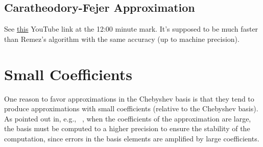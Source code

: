 \documentclass[../fheimpl.tex]{subfiles}
\begin{document}
    \subsection{Caratheodory-Fejer Approximation}
    See \href{https://www.youtube.com/watch?v=6JPwpTOcydM&list=PLnbmMskCVh1cCnWbmgxI0BM0UD2JHH9fz&index=6}{this} YouTube link at the 12:00 minute mark. It's supposed to be much faster than Remez's algorithm with the same accuracy (up to machine precision).

    \section{Small Coefficients}
    \label{sec:small-approx-coeffs}
    One reason to favor approximations in the Chebyshev basis is that they tend to produce approximations with small coefficients (relative to the Chebyshev basis). As pointed out in, e.g., ~\cite{cryptoeprint:2021/572}, when the coefficients of the approximation are large, the basis must be computed to a higher precision to ensure the stability of the computation, since errors in the basis elements are amplified by large coefficients.
	
    \ifcompileasbook
    \else
    \printbibliography
    \fi
\end{document}
